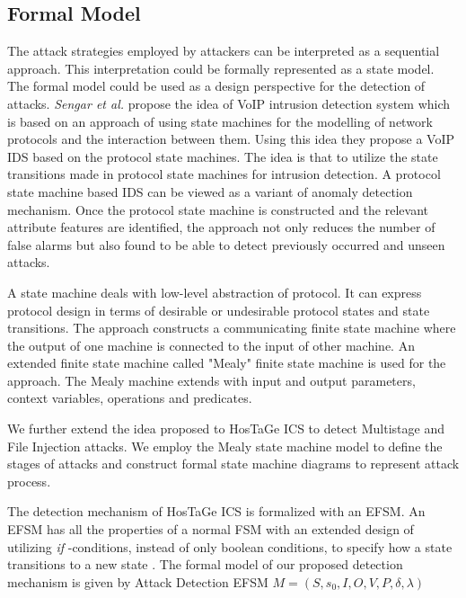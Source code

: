 \documentclass[article,msc=informatik,type=msc,colorback,accentcolor=tud9c]{tudthesis}
\begin{document}
	\subsection{Formal Model}\label{Formal Model}
	
	The attack strategies employed by attackers can be interpreted as a sequential approach. This interpretation could be formally represented as a state model. The formal model could be used as a design perspective for the detection of attacks.\textit{ Sengar et al.} \cite{Sengar06voipintrusion} propose the idea of \ac{VoIP} intrusion detection system which is based on an approach of using state machines for the modelling of network protocols and the interaction between them. Using this idea they propose a \ac{VoIP} IDS based on the protocol state machines. The idea is that to utilize the state transitions made in protocol state machines for intrusion detection. A protocol state machine based IDS can be viewed as a variant of anomaly detection mechanism. Once the protocol state machine is constructed and the relevant attribute features are identified, the approach not only reduces the number of false alarms but also found to be able to detect previously occurred and unseen attacks.
	
	\vspace{3mm}
	A state machine deals with low-level abstraction of protocol. It can express protocol design in terms of desirable or undesirable protocol states and state transitions. The approach constructs a communicating finite state machine where the output of one machine is connected to the input of other machine. An extended finite state machine called "Mealy" finite state machine is used for the approach. The Mealy machine extends with input and output parameters, context variables, operations and predicates.


	\vspace{3mm}
	We further extend the idea proposed to HosTaGe ICS to detect Multistage and File Injection attacks. We employ the Mealy state machine model \cite{wagner2005moore}  to define the stages of attacks and construct formal state machine diagrams to represent attack process.


	\vspace{3mm}
	The detection mechanism of HosTaGe ICS is formalized with an \ac{EFSM}. An \ac{EFSM} has all the properties of a normal \ac{FSM} with an extended design of utilizing \textit{if} -conditions, instead of only boolean conditions, to specify how a state transitions to a new state \cite{InteractiveSystems}. The formal model of our proposed detection mechanism is given by Attack Detection \ac{EFSM} $M = (S, s_0,I,O,V,P,\delta,\lambda)$~\cite{1234567}
\end{document}
